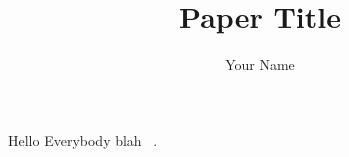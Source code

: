 \documentclass{article}
\title{Paper Title}
\author{Your Name}
\begin{document}
    \maketitle

     

     

Hello Everybody
    blah ~\cite{Jo09, PaperII}.

     

     
    
    

     

    
\end{document}
